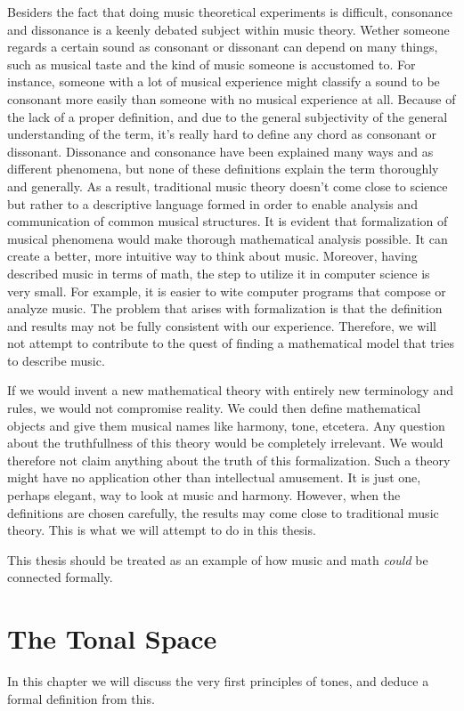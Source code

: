 \documentclass[a4paper]{book}
\theoremstyle{definition}
\begin{document}
Besiders the fact that doing music theoretical experiments is difficult, consonance and dissonance is a keenly debated subject within music theory.
Wether someone regards a certain sound as consonant or dissonant can depend on many things, such as musical taste and the kind of music someone is accustomed to.
For instance, someone with a lot of musical experience might classify a sound to be consonant more easily than someone with no musical experience at all.
Because of the lack of a proper definition, and due to the general subjectivity of the general understanding of the term, it's really hard to define any chord as consonant or dissonant.
Dissonance and consonance have been explained many ways and as different phenomena, but none of these definitions explain the term thoroughly and generally.
As a result, traditional music theory doesn't come close to science but rather to a descriptive language formed in order to enable analysis and communication of common musical structures. 
It is evident that formalization of musical phenomena would make thorough mathematical analysis possible.
It can create a better, more intuitive way to think about music.
Moreover, having described music in terms of math, the step to utilize it in computer science is very small.
For example, it is easier to wite computer programs that compose or analyze music.
The problem that arises with formalization is that the definition and results may not be fully consistent with our experience.
Therefore, we will not attempt to contribute to the quest of finding a mathematical model that tries to describe music.

If we would invent a new mathematical theory with entirely new terminology and rules, we would not compromise reality.
We could then define mathematical objects and give them musical names like harmony, tone, etcetera.
Any question about the truthfullness of this theory would be completely irrelevant.
We would therefore not claim anything about the truth of this formalization.
Such a theory might have no application other than intellectual amusement.
It is just one, perhaps elegant, way to look at music and harmony.
However, when the definitions are chosen carefully, the results may come close to traditional music theory.
This is what we will attempt to do in this thesis.

This thesis should be treated as an example of how music and math \emph{could} be connected formally.


\chapter{The Tonal Space}
\label{tonal_space}
In this chapter we will discuss the very first principles of tones, and deduce a formal definition from this.
\end{document}
